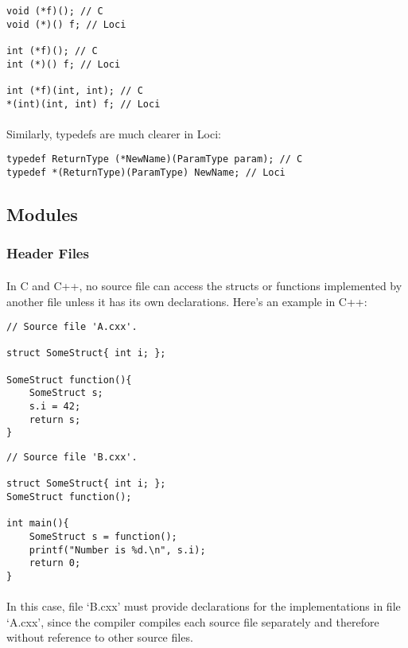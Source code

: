 \documentclass[12pt,twoside,notitlepage]{report}
\begin{document}
\begin{lstlisting}
void (*f)(); // C
void (*)() f; // Loci

int (*f)(); // C
int (*)() f; // Loci

int (*f)(int, int); // C
*(int)(int, int) f; // Loci
\end{lstlisting}


\paragraph{}
Similarly, typedefs are much clearer in Loci:

\begin{lstlisting}
typedef ReturnType (*NewName)(ParamType param); // C
typedef *(ReturnType)(ParamType) NewName; // Loci
\end{lstlisting}


\clearpage

\subsection{Modules}

\subsubsection{Header Files}

\paragraph{}
In C and C++, no source file can access the structs or functions implemented by another file unless it has its own declarations. Here's an example in C++:

\begin{lstlisting}
// Source file 'A.cxx'.

struct SomeStruct{ int i; };

SomeStruct function(){
	SomeStruct s;
	s.i = 42;
	return s;
}
\end{lstlisting}

\begin{lstlisting}
// Source file 'B.cxx'.

struct SomeStruct{ int i; };
SomeStruct function();

int main(){
	SomeStruct s = function();
	printf("Number is %d.\n", s.i);
	return 0;
}
\end{lstlisting}

\paragraph{}
In this case, file `B.cxx' must provide declarations for the implementations in file `A.cxx', since the compiler compiles each source file separately and therefore without reference to other source files.
\end{document}
